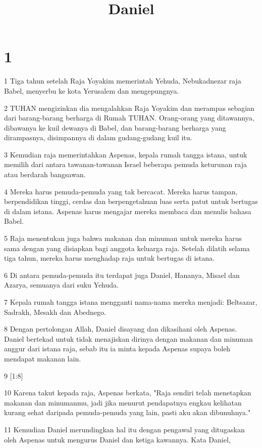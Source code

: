 

\title{Daniel}

\chapter{1}

\par 1 Tiga tahun setelah Raja Yoyakim memerintah Yehuda, Nebukadnezar raja Babel, menyerbu ke kota Yerusalem dan mengepungnya.
\par 2 TUHAN mengizinkan dia mengalahkan Raja Yoyakim dan merampas sebagian dari barang-barang berharga di Rumah TUHAN. Orang-orang yang ditawannya, dibawanya ke kuil dewanya di Babel, dan barang-barang berharga yang dirampasnya, disimpannya di dalam gudang-gudang kuil itu.
\par 3 Kemudian raja memerintahkan Aspenas, kepala rumah tangga istana, untuk memilih dari antara tawanan-tawanan Israel beberapa pemuda keturunan raja atau berdarah bangsawan.
\par 4 Mereka harus pemuda-pemuda yang tak bercacat. Mereka harus tampan, berpendidikan tinggi, cerdas dan berpengetahuan luas serta patut untuk bertugas di dalam istana. Aspenas harus mengajar mereka membaca dan menulis bahasa Babel.
\par 5 Raja menentukan juga bahwa makanan dan minuman untuk mereka harus sama dengan yang disiapkan bagi anggota keluarga raja. Setelah dilatih selama tiga tahun, mereka harus menghadap raja untuk bertugas di istana.
\par 6 Di antara pemuda-pemuda itu terdapat juga Daniel, Hananya, Misael dan Azarya, semuanya dari suku Yehuda.
\par 7 Kepala rumah tangga istana mengganti nama-nama mereka menjadi: Beltsazar, Sadrakh, Mesakh dan Abednego.
\par 8 Dengan pertolongan Allah, Daniel disayang dan dikasihani oleh Aspenas. Daniel bertekad untuk tidak menajiskan dirinya dengan makanan dan minuman anggur dari istana raja, sebab itu ia minta kepada Aspenas supaya boleh mendapat makanan lain.
\par 9 [1:8]
\par 10 Karena takut kepada raja, Aspenas berkata, "Raja sendiri telah menetapkan makanan dan minumanmu, jadi jika menurut pendapatnya engkau kelihatan kurang sehat daripada pemuda-pemuda yang lain, pasti aku akan dibunuhnya."
\par 11 Kemudian Daniel merundingkan hal itu dengan pengawal yang ditugaskan oleh Aspenas untuk mengurus Daniel dan ketiga kawannya. Kata Daniel,

